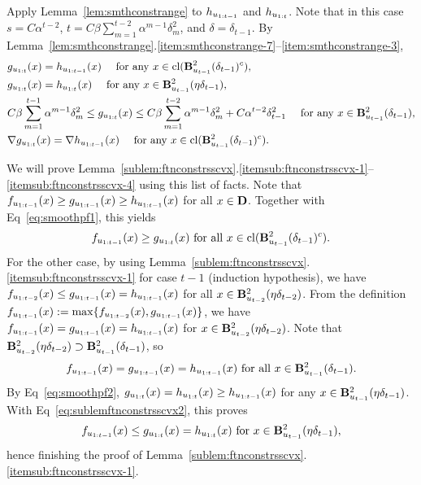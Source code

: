 Apply Lemma~\ref{lem:smthconstrange} to $h_{u_{1:{t-1}}}$ and $h_{u_{1:{t}}}$.
Note that in this case $s = C\alpha^{t-2}$, $t = C \beta \sum_{m=1}^{t-2} \alpha^{m-1}\delta_m^2$, and $\delta = \delta_{t-1}$.
By Lemma~\ref{lem:smthconstrange}.\ref{item:smthconstrange-7}--\ref{item:smthconstrange-3},
\begin{align}
	&\gut(x) = \ftninutmone(x) \quad \text{ for any } x \in \cl(\Btwotmone^c), \label{eq:smoothpf1}\\
	&\gut(x) = \ftninut(x) \quad \text{ for any } x \in \Btwotmoneh, \label{eq:smoothpf2}\\
	&C \beta \sum_{m=1}^{t-1} \alpha^{m-1}\delta_m^2
	\leq
	\gut(x)
	\leq
	C \beta \sum_{m=1}^{t-2} \alpha^{m-1}\delta_m^2 + C\alpha^{t-2} \delta_{t-1}^2
	\quad \text{ for any } x \in \Btwotmone, \label{eq:smoothpf3}\\
	&\nabla \gut(x) = \nabla \ftninutmone(x) \quad \text{ for any } x \in \cl(\Btwotmone^c).\label{eq:smoothpf4}
\end{align}

We will prove Lemma~\ref{sublem:ftnconstrsscvx}.\ref{itemsub:ftnconstrsscvx-1}--\ref{itemsub:ftnconstrsscvx-4} using this list of facts.
Note that $f_{u_{1:{t-1}}}(x) \geq g_{u_{1:{t-1}}}(x) \geq h_{u_{1:{t-1}}}(x)$ for all $x \in \mathbf{D}$.
Together with Eq~\eqref{eq:smoothpf1}, this yields
\begin{equation}
\label{eq:sublemftnconstrsscvx1}
\ftnutmone(x) \geq \gut(x) \text{ for all } x \in \cl(\Btwotmone^c).
\end{equation}
For the other case, by using Lemma~\ref{sublem:ftnconstrsscvx}.\ref{itemsub:ftnconstrsscvx-1} for case $t-1$ (induction hypothesis), 
we have $f_{u_{1:{t-2}}}(x) \leq g_{u_{1:{t-1}}}(x) = h_{u_{1:{t-1}}}(x)$ for all $x \in \mathbf{B}^2_{u_{t-2}}({\eta\delta_{t-2}})$.
From the definition $f_{u_{1:{t-1}}}(x):= \max \{ f_{u_{1:{t-2}}} (x), g_{u_{1:{t-1}}}(x) \}$, we have
$f_{u_{1:{t-1}}}(x) = g_{u_{1:{t-1}}}(x) = h_{u_{1:{t-1}}}(x)$ for $x \in \mathbf{B}^2_{u_{t-2}}({\eta\delta_{t-2}})$.
Note that $\mathbf{B}^2_{u_{t-2}}({\eta\delta_{t-2}}) \supset \mathbf{B}^2_{u_{t-1}}({\delta_{t-1}})$, so 
\begin{equation}
\label{eq:sublemftnconstrsscvx2}
f_{u_{1:{t-1}}}(x) = g_{u_{1:{t-1}}}(x) = h_{u_{1:{t-1}}}(x) \text{ for all } x \in \mathbf{B}^2_{u_{t-1}}({\delta_{t-1}}).
\end{equation}
By Eq~\eqref{eq:smoothpf2}, $g_{u_{1:{t}}}(x) = h_{u_{1:{t}}}(x) \geq h_{u_{1:{t-1}}}(x)$ for any $x \in \mathbf{B}^2_{u_{t-1}}({\eta\delta_{t-1}})$.
With Eq~\eqref{eq:sublemftnconstrsscvx2}, this proves 
\begin{equation*}
f_{u_{1:{t-1}}}(x) \leq g_{u_{1:{t}}}(x) = h_{u_{1:{t}}}(x) \text{ for } x \in \mathbf{B}^2_{u_{t-1}}({\eta\delta_{t-1}}),
\end{equation*}
hence finishing the proof of Lemma~\ref{sublem:ftnconstrsscvx}.\ref{itemsub:ftnconstrsscvx-1}.


